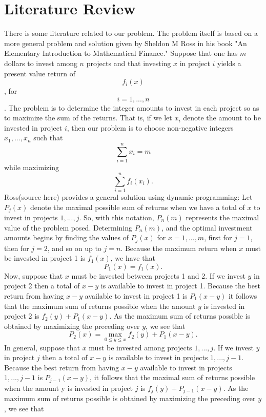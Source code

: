 \documentclass{article}
\begin{document}
\section{Literature Review}
There is some literature related to our problem.  The problem itself is based on a more general problem and solution given by Sheldon M Ross in his book "An Elementary Introduction to Mathematical Finance."
Suppose that one has $m$ dollars to invest among $n$ projects and that investing $x$ in project $i$ yields a present value return of $$f_{i}(x)$$, for $$i = 1, ..., n$$. The problem is to determine the integer amounts to invest in each project so as to maximize the sum of the returns.  That is, if we let $x_{i}$ denote the amount to be invested in project $i$, then our problem is to choose non-negative integers $x_{1}, ..., x_{n}$ such that $$\sum_{i=1}^{n}x_{i} = m$$ while maximizing $$\sum_{i=1}^{n} f_{i}(x_{i}).$$
\newline
Ross(source here) provides a general solution using dynamic programming:
\linebreak
Let $P_{j}(x)$ denote the maximal possible sum of returns when we have a total of $x$ to invest in projects $1, ..., j$. So, with this notation, $P_{n}(m)$ represents the maximal value of the problem posed. Determining $P_{n}(m)$, and the optimal investment amounts begins by finding the values of $P_{j}(x)$ for $x = 1, ..., m$, first for $j = 1$, then for $j=2$, and so on up to $j=n$.
\linebreak
Because the maximum return when $x$ must be invested in project 1 is $f_{1}(x)$, we have that 
\newline
$$P_{1}(x) = f_{1}(x).$$
\newline
Now, suppose that $x$ must be invested between projects 1 and 2. If we invest $y$ in project 2 then a total of $x-y$ is available to invest in project 1. Because the best return from having $x-y$ available to invest in project 1 is $P_{1}(x-y)$ it follows that the maximum sum of returns possible when the amount $y$ is invested in project 2 is $f_{2}(y) + P_{1}(x-y).$ As the maximum sum of returns possible is obtained by maximizing the preceding over $y$, we see that $$P_{2}(x) = \max_{0\leq y\leq x} f_{2}(y) + P_{1}(x-y).$$
In general, suppose that $x$ must be invested among projects $1, ..., j$. If we invest $y$ in project $j$ then a total of $x-y$ is available to invest in projects $1, ..., j-1$. Because the best return from having $x-y$ available to invest in projects $1, ..., j-1$ is $P_{j-1}(x-y)$, it follows that the maximal sum of returns possible when the amount y is invested in project $j$ is $f_{j}(y) + P_{j-1}(x-y).$ As the maximum sum of returns possible is obtained by maximizing the preceding over $y$, we see that 
\end{document}
